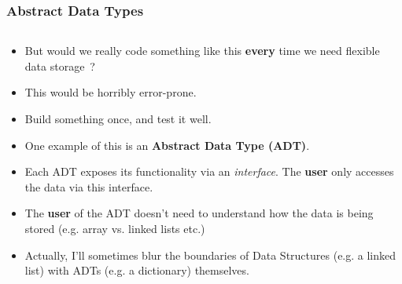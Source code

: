 
\begin{frame}[fragile]
\frametitle{Abstract Data Types}
\begin{columns}[T]

\begin{column}{0.90\textwidth}
\begin{itemize}[<+->]
\item But would we really code something like this {\bf every} time we
need flexible data storage~? 
\item This would be horribly error-prone.
\item Build something once, and test it well.
\item One example of this is an {\bf Abstract Data Type (ADT)}.
\item Each ADT exposes its functionality via an {\em interface}.
The {\bf user} only accesses the data via this interface.
\item The {\bf user} of the ADT doesn't need to understand how the data is
being stored (e.g. array vs. linked lists etc.)
\item Actually, I'll sometimes blur the boundaries of Data Structures (e.g. a linked list) with ADTs (e.g. a dictionary) themselves.
\end{itemize}
\end{column}

\end{columns}
\end{frame}


